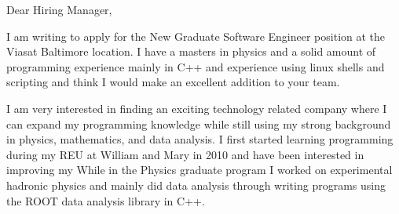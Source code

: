 \documentclass{resume} %
\begin{document}

\begin{rSection}{}
Dear Hiring Manager,


I am writing to apply for the New Graduate Software Engineer position at the Viasat Baltimore location. I have a masters in physics and a solid amount of programming experience mainly in C++ and experience using linux shells and scripting and think I would make an excellent addition to your team.

I am very interested in finding an exciting technology related company where I can expand my programming knowledge while still using my strong background in physics, mathematics, and data analysis. I first started learning programming during my REU at William and Mary in 2010 and have been interested in improving my While in the Physics graduate program I worked on experimental hadronic physics and mainly did data analysis through writing programs using the ROOT data analysis library in C++.



\end{rSection}


\end{document}
